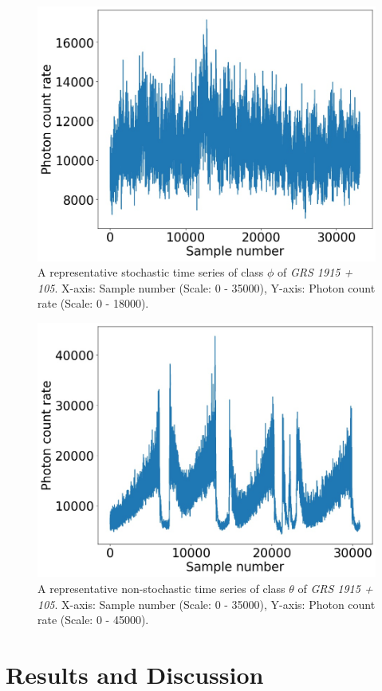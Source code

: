 \documentclass[10pt,conference]{IEEEtran}
\begin{document}
\begin{figure}[ht]
\centering
\includegraphics[width=0.8\linewidth]{sac_ascf_phi.jpg}
\caption{A representative stochastic time series of class $\phi$ of \textit{GRS 1915 + 105}. X-axis: Sample number (Scale: 0 - 35000), Y-axis: Photon count rate (Scale: 0 - 18000). }
\label{phi_ts}
\end{figure}

\begin{figure}[ht]
\centering
\includegraphics[width=0.8\linewidth]{sac_ascf_theta.jpg}
\caption{A representative non-stochastic time series of class $\theta$ of \textit{GRS 1915 + 105}. X-axis: Sample number (Scale: 0 - 35000), Y-axis: Photon count rate (Scale: 0 - 45000). }
\label{theta_ts}
\end{figure}

\section{Results and Discussion}
\end{document}
